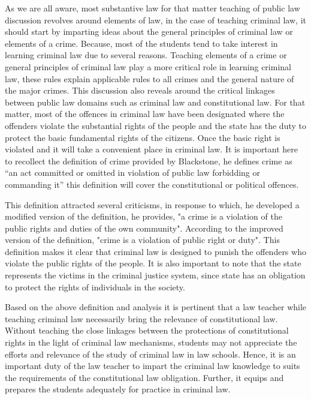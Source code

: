 \begin{multicols}{2}
\noi
As we are all aware, most substantive law for that matter teaching of public law
discussion revolves around elements of law, in the case of teaching criminal law, it
should start by imparting ideas about the general principles of criminal law or
elements of a crime. Because, most of the students tend to take interest in learning
criminal law due to several reasons. Teaching elements of a crime or general
principles of criminal law play a more critical role in learning criminal law, these
rules explain applicable rules to all crimes and the general nature of the major crimes.
This discussion also reveals around the critical linkages between public law domains
such as criminal law and constitutional law. For that matter, most of the offences in
criminal law have been designated where the offenders violate the substantial rights
of the people and the state has the duty to protect the basic fundamental rights of the
citizens. Once the basic right is violated and it will take a convenient place in criminal
law. It is important here to recollect the definition of crime provided by Blackstone,
he defines crime as “an act committed or omitted in violation of public law forbidding
or commanding it” this definition will cover the constitutional or political offences.

\noi
This definition attracted several criticisms, in response to which, he developed a
modified version of the definition, he provides, "a crime is a violation of the public
rights and duties of the own community". According to the improved version of the
definition, "crime is a violation of public right or duty". This definition makes it clear
that criminal law is designed to punish the offenders who violate the public rights of
the people. It is also important to note that the state represents the victims in the
criminal justice system, since state has an obligation to protect the rights of
individuals in the society.

\noi
Based on the above definition and analysis it is pertinent that a law teacher while
teaching criminal law necessarily bring the relevance of constitutional law. Without
teaching the close linkages between the protections of constitutional rights in the light
of criminal law mechanisms, students may not appreciate the efforts and relevance of
the study of criminal law in law schools. Hence, it is an important duty of the law
teacher to impart the criminal law knowledge to suits the requirements of the constitutional law obligation. Further, it equips and prepares the students adequately for practice in criminal law.


\end{multicols}
